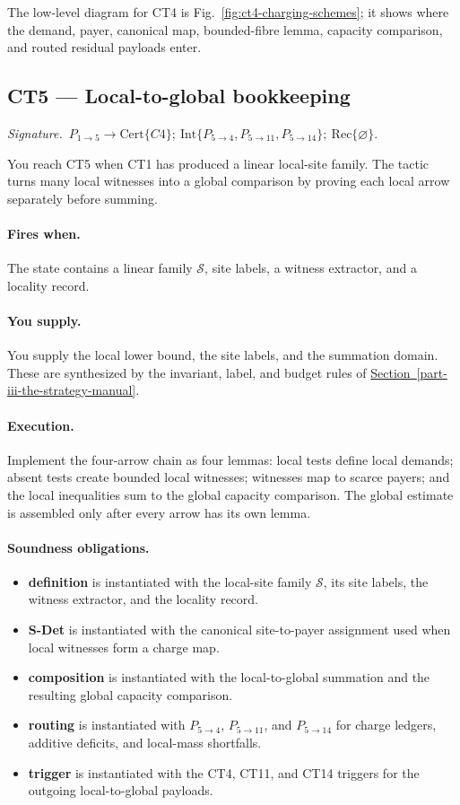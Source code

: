 \documentclass[
  11pt,
]{article}
\providecommand{\tightlist}{%
  \setlength{\itemsep}{0pt}\setlength{\parskip}{0pt}}
\theoremstyle{definition}
\newcommand{\secref}[1]{\hyperref[#1]{Section~\ref*{#1}}}
\newcommand{\ctsignature}[1]{\par\noindent\emph{Signature.}\ #1\par\medskip}
\newcommand{\ctcert}[1]{\mathrm{Cert}\{#1\}}
\newcommand{\ctint}[1]{\mathrm{Int}\{#1\}}
\newcommand{\ctrec}[1]{\mathrm{Rec}\{#1\}}
\newcommand{\ctnone}{\varnothing}
\newcommand{\ctpar}[1]{\paragraph{#1.}}
\begin{document}
The low-level diagram for CT4 is Fig.~\ref{fig:ct4-charging-schemes};
it shows where the demand, payer, canonical map, bounded-fibre lemma,
capacity comparison, and routed residual payloads enter.


\subsection{CT5 --- Local-to-global bookkeeping}\label{ct:5}\label{the-local-versus-global-rationale}
\ctsignature{\(P_{1\to5}\to \ctcert{C4};\ \ctint{P_{5\to4},P_{5\to11},P_{5\to14}};\ \ctrec{\ctnone}\).}

You reach CT5 when CT1 has produced a linear local-site family.  The
tactic turns many local witnesses into a global comparison by proving
each local arrow separately before summing.

\ctpar{Fires when}
The state contains a linear family \(\mathcal S\), site labels, a witness
extractor, and a locality record.

\ctpar{You supply}
You supply the local lower bound, the site labels, and the summation
domain.  These are synthesized by the invariant, label, and budget rules
of \secref{part-iii-the-strategy-manual}.

\ctpar{Execution}
Implement the four-arrow chain as four lemmas: local tests define local
demands; absent tests create bounded local witnesses; witnesses map to
scarce payers; and the local inequalities sum to the global capacity
comparison.  The global estimate is assembled only after every arrow has
its own lemma.

\ctpar{Soundness obligations}
\begin{itemize}
\tightlist
\item \textbf{definition} is instantiated with the local-site family \(\mathcal S\), its site labels, the witness extractor, and the locality record.
\item \textbf{S-Det} is instantiated with the canonical site-to-payer assignment used when local witnesses form a charge map.
\item \textbf{composition} is instantiated with the local-to-global summation and the resulting global capacity comparison.
\item \textbf{routing} is instantiated with \(P_{5\to4}\), \(P_{5\to11}\), and \(P_{5\to14}\) for charge ledgers, additive deficits, and local-mass shortfalls.
\item \textbf{trigger} is instantiated with the CT4, CT11, and CT14 triggers for the outgoing local-to-global payloads.
\end{itemize}
\end{document}
